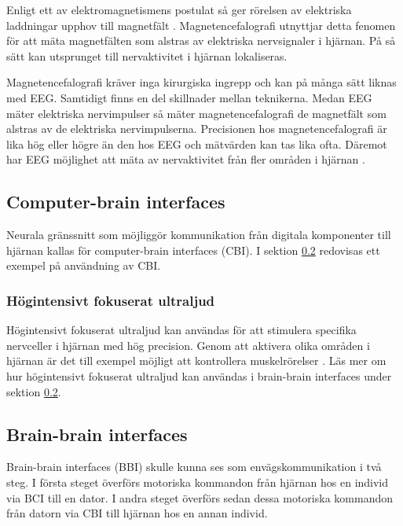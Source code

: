 \documentclass[12pt, a4paper]{article}
\begin{document}
Enligt ett av elektromagnetismens postulat så ger rörelsen av elektriska
laddningar upphov till magnetfält \cite{electromagnetism}. Magnetencefalografi
utnyttjar detta fenomen för att mäta magnetfälten som alstras av elektriska
nervsignaler i hjärnan. På så sätt kan utsprunget till nervaktivitet i hjärnan
lokaliseras.

Magnetencefalografi kräver inga kirurgiska ingrepp och kan på många sätt liknas
med EEG. Samtidigt finns en del skillnader mellan teknikerna. Medan EEG mäter
elektriska nervimpulser så mäter magnetencefalografi de magnetfält som alstras
av de elektriska nervimpulserna. Precisionen hos magnetencefalografi är lika hög
eller högre än den hos EEG och mätvärden kan tas lika ofta. Däremot har EEG
möjlighet att mäta av nervaktivitet från fler områden i hjärnan \cite{meg_eeg}.

%
%

\subsection{Computer-brain interfaces}

Neurala gränssnitt som möjliggör kommunikation från digitala komponenter till
hjärnan kallas för computer-brain interfaces (CBI). I sektion \ref{BBI}
redovisas ett exempel på användning av CBI.

\subsubsection{Högintensivt fokuserat ultraljud}
Högintensivt fokuserat ultraljud kan användas för att stimulera specifika
nervceller i hjärnan med hög precision. Genom att aktivera olika områden i
hjärnan är det till exempel möjligt att kontrollera muskelrörelser \cite{bbi}.
Läs mer om hur högintensivt fokuserat ultraljud kan användas i brain-brain
interfaces under sektion \ref{BBI}.

\subsection{Brain-brain interfaces}
\label{BBI}

Brain-brain interfaces (BBI) skulle kunna ses som envägskommunikation i två
steg. I första steget överförs motoriska kommandon från hjärnan hos en individ
via BCI till en dator. I andra steget överförs sedan dessa motoriska kommandon
från datorn via CBI till hjärnan hos en annan individ.
\end{document}
